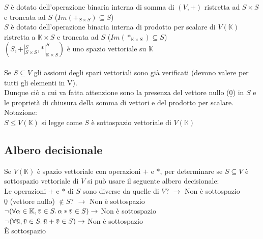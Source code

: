\documentclass[a4paper, twoside, italian, 11pt]{book}
\newcommand{\overbar}[1] {\mkern 1.5mu\overline{\mkern-1.5mu#1\mkern-1.5mu}\mkern 1.5mu}
\newcommand{\K}{\mathbb K}
\begin{document}
\noindent
$S$ è dotato dell'operazione binaria interna di somma di $(V, +)$ ristretta ad $S \times S$ e troncata ad $S$ ($Im(+_{S \times S}) \subseteq S$) \\

\noindent
$S$ è dotato dell'operazione binaria interna di prodotto per scalare di $V(\K)$ ristretta a $\K \times S$ e troncata ad $S$ ($Im(*_{\K \times S}) \subseteq S$) \\

\noindent
$(S, +|_{S \times S}^S, *|_{\K \times S}^S)$ è uno spazio vettoriale su $\K$ \\\\

\noindent
Se $S \subseteq V$ gli assiomi degli spazi vettoriali sono già verificati (devono valere per tutti gli elementi in V). \\
Dunque ciò a cui va fatta attenzione sono la presenza del vettore nullo ($\underline 0$) in $S$ e le proprietà di chiusura della somma di vettori e del prodotto per scalare. \\

\noindent
Notazione: \\
$S \leq V(\K)$ si legge come $S$ è sottospazio vettoriale di $V(\K)$


\subsection{Albero decisionale}

Se $V(\K)$ è spazio vettoriale con operazioni $+$ e $*$, per determinare se $S \subseteq V$ è sottospazio vettoriale di $V$ si può usare il seguente albero decisionale: \\

\noindent
Le operazioni $+$ e $*$ di $S$ sono diverse da quelle di $V$? $\rightarrow$ Non è sottospazio \\

\noindent
$\underline{0}$ (vettore nullo) $\not\in S$? $\rightarrow$ Non è sottospazio \\

\noindent
$\lnot(\forall \alpha \in \K, \overbar v \in S \ldotp \alpha * \overbar v \in S) \rightarrow$ Non è sottospazio \\

\noindent
$\lnot(\forall \overbar u, \overbar v \in S \ldotp \overbar u + \overbar v \in S) \rightarrow$ Non è sottospazio \\

\noindent
È sottospazio
\end{document}
